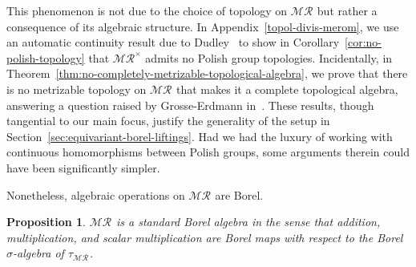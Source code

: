 \documentclass[12pt]{paper}
\numberwithin{equation}{section}
\theoremstyle{plain}
\newtheorem{proposition}[theorem]{Proposition}
\theoremstyle{definition}
\newcommand{\merom}[1][]{\mathcal{MR}_{#1}}
\newcommand{\meromnz}{\merom^{\times}}
\begin{document}
This phenomenon is not due to the choice of topology on \(\merom\) but rather a consequence of its
algebraic structure. In Appendix~\ref{topol-divis-merom}, we use an automatic continuity result due
to Dudley~\cite{dudleyContinuityHomomorphisms1961} to show in Corollary~\ref{cor:no-polish-topology}
that \(\meromnz\) admits no Polish group topologies.  Incidentally, in
Theorem~\ref{thm:no-completely-metrizable-topological-algebra}, we prove that there is no metrizable
topology on \(\merom\) that makes it a complete topological algebra, answering a question raised by
Grosse-Erdmann in~\cite{grosse-erdmannLocallyConvexTopology1995}.  These results, though tangential
to our main focus, justify the generality of the setup in
Section~\ref{sec:equivariant-borel-liftings}.  Had we had the luxury of working with continuous
homomorphisms between Polish groups, some arguments therein could have been significantly simpler.

Nonetheless, algebraic operations on \(\merom\) are Borel.

\begin{proposition}
  \label{prop:meromnz-standard-Borel-algebra}
  \(\merom\) is a standard Borel algebra in the sense that addition, multiplication, and scalar
  multiplication are Borel maps with respect to the Borel \(\sigma\)-algebra of \(\tau_{\merom}\).
\end{proposition}
\end{document}
